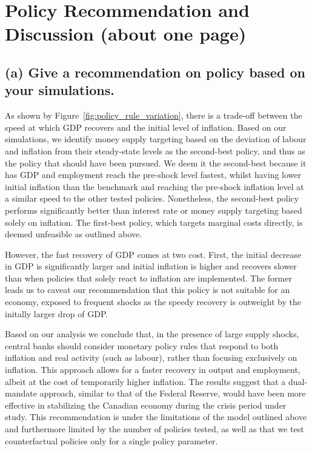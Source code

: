 \documentclass[12pt]{article}
\begin{document}

\newpage
\section{Policy Recommendation and Discussion (about one page)}\label{s:discussion}
\subsection*{(a) Give a recommendation on policy based on your simulations.}

As shown by Figure~\ref{fig:policy_rule_variation}, there is a trade-off between the speed at which GDP recovers and the initial level of inflation. Based on our simulations, we identify money supply targeting based on the deviation of labour and inflation from their steady-state levels as the second-best policy, and thus as the policy that should have been pursued. We deem it the second-best because it has GDP and employment reach the pre-shock level fastest, whilst having lower initial inflation than the benchmark and reaching the pre-shock inflation level at a similar speed to the other tested policies. Nonetheless, the second-best policy performs significantly better than interest rate or money supply targeting based solely on inflation. The first-best policy, which targets marginal costs directly, is deemed unfeasible as outlined above. 

However, the fast recovery of GDP comes at two cost. First, the initial decrease in GDP is significantly larger and initial inflation is higher and recovers slower than when policies that solely react to inflation are implemented. The former leads us to caveat our recommendation that this policy is not suitable for an economy, exposed to frequent shocks as the speedy recovery is outweight by the initally larger drop of GDP. 

Based on our analysis we conclude that, in the presence of large supply shocks, central banks should consider monetary policy rules that respond to both inflation and real activity (such as labour), rather than focusing exclusively on inflation. This approach allows for a faster recovery in output and employment, albeit at the cost of temporarily higher inflation. The results suggest that a dual-mandate approach, similar to that of the Federal Reserve, would have been more effective in stabilizing the Canadian economy during the crisis period under study. This recommendation is under the limitations of the model outlined above and furthermore limited by the number of policies tested, as well as that we test counterfactual policies only for a single policy parameter. 
\end{document}
